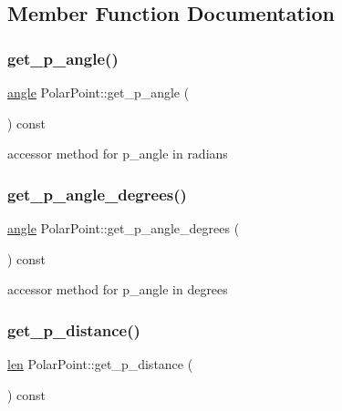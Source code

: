 \subsection{Member Function Documentation}
\mbox{\label{class_polar_point_a5918f355697069f0e54e924673c7a872}} 
\subsubsection{\texorpdfstring{get\_p\_angle()}{get\_p\_angle()}}
{\footnotesize\ttfamily \mbox{\hyperlink{primitives_8h_a41ee332ff1a31807cb838b616c186dd7}{angle}} Polar\+Point\+::get\+\_\+p\+\_\+angle (\begin{DoxyParamCaption}{ }\end{DoxyParamCaption}) const}

accessor method for p\+\_\+angle in radians \mbox{\label{class_polar_point_a32537087535c21aee75a7799c168645d}} 
\subsubsection{\texorpdfstring{get\_p\_angle\_degrees()}{get\_p\_angle\_degrees()}}
{\footnotesize\ttfamily \mbox{\hyperlink{primitives_8h_a41ee332ff1a31807cb838b616c186dd7}{angle}} Polar\+Point\+::get\+\_\+p\+\_\+angle\+\_\+degrees (\begin{DoxyParamCaption}{ }\end{DoxyParamCaption}) const}

accessor method for p\+\_\+angle in degrees \mbox{\label{class_polar_point_afb68d253c45fe88bc49fafcf81ec2276}} 
\subsubsection{\texorpdfstring{get\_p\_distance()}{get\_p\_distance()}}
{\footnotesize\ttfamily \mbox{\hyperlink{primitives_8h_a0daa439ba651ea0fd8d02392244db601}{len}} Polar\+Point\+::get\+\_\+p\+\_\+distance (\begin{DoxyParamCaption}{ }\end{DoxyParamCaption}) const}

